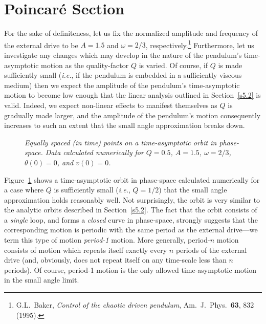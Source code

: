 \section{Poincar\'{e} Section}
For the sake of definiteness, let us fix the normalized amplitude and frequency of the external
drive to be $A=1.5$ and $\omega=2/3$, respectively.\footnote{G.L.~Baker, {\em Control of
the chaotic driven pendulum},  Am.\ J.\ Phys.\
{\bf 63}, 832 (1995).}
 Furthermore, let us investigate any changes which
may develop in the nature of the
pendulum's time-asymptotic motion
 as the quality-factor $Q$ is varied. Of course, if $Q$ is made sufficiently small 
({\em i.e.}, if the pendulum is embedded in a sufficiently viscous medium) then we expect the
amplitude of the pendulum's time-asymptotic motion to become low enough that the linear analysis
outlined in Section~\ref{s5.2} is valid.  Indeed, we expect non-linear effects to manifest themselves
as $Q$ is gradually made larger, and the amplitude of the pendulum's motion 
consequently increases to such an extent that the
small angle approximation breaks down.


\begin{figure}
\epsfysize=2.5in
\centerline{}
\caption{\em Equally spaced (in time) points on a time-asymptotic orbit
in phase-space. Data calculated numerically
 for $Q=0.5$, $A=1.5$, $\omega=2/3$, $\theta(0)=0$, and
$v(0)=0$. }\label{f18}
\end{figure}

Figure~\ref{f18} shows a time-asymptotic orbit in phase-space 
calculated numerically for a case where $Q$ is sufficiently
small ({\em i.e.}, $Q=1/2$) that the small angle approximation holds reasonably well. Not surprisingly,
the orbit is very similar to the analytic orbits
 described in Section~\ref{s5.2}. The fact that the orbit consists
of a {\em single}\/ loop, and forms a {\em closed}\/ curve in phase-space,
 strongly suggests that the corresponding
motion is periodic with the same period as the external drive---we term this type of motion
{\em period-1}\/ motion. More generally, period-$n$ motion consists of motion which
repeats itself exactly every $n$ periods of the external drive (and, obviously,
does not repeat itself on any time-scale less than $n$ periods). Of course, period-1 motion
is the only allowed time-asymptotic motion in the small angle limit. 

